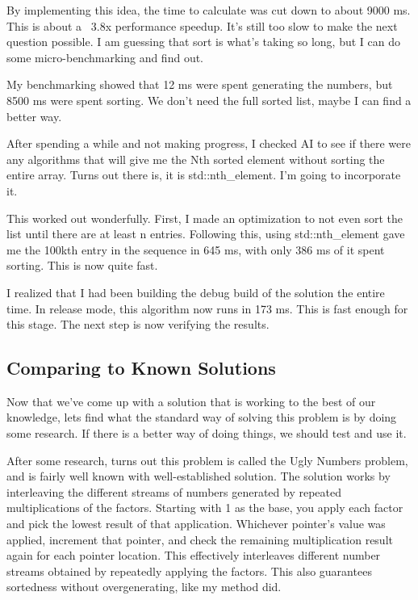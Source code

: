 \documentclass{article}
\begin{document}
By implementing this idea, the time to calculate was cut down to about 9000 ms. This is about a ~3.8x performance speedup. It's still too slow to make the next question possible. I am guessing that sort is what's taking so long, but I can do some micro-benchmarking and find out. \newline

My benchmarking showed that 12 ms were spent generating the numbers, but 8500 ms were spent sorting. We don't need the full sorted list, maybe I can find a better way. \newline

After spending a while and not making progress, I checked AI to see if there were any algorithms that will give me the Nth sorted element without sorting the entire array. Turns out there is, it is std::nth\_element. I'm going to incorporate it. \newline

This worked out wonderfully. First, I made an optimization to not even sort the list until there are at least n entries. Following this, using std::nth\_element gave me the 100kth entry in the sequence in 645 ms, with only 386 ms of it spent sorting. This is now quite fast. \newline

I realized that I had been building the debug build of the solution the entire time. In release mode, this algorithm now runs in 173 ms. This is fast enough for this stage. The next step is now verifying the results.

\newpage

\subsection{Comparing to Known Solutions}

Now that we've come up with a solution that is working to the best of our knowledge, lets find what the standard way of solving this problem is by doing some research. If there is a better way of doing things, we should test and use it. \newline

After some research, turns out this problem is called the Ugly Numbers problem, and is fairly well known with well-established solution. The solution works by interleaving the different streams of numbers generated by repeated multiplications of the factors. Starting with 1 as the base, you apply each factor and pick the lowest result of that application. Whichever pointer's value was applied, increment that pointer, and check the remaining multiplication result again for each pointer location. This effectively interleaves different number streams obtained by repeatedly applying the factors. This also guarantees sortedness without overgenerating, like my method did. \newline
\end{document}
